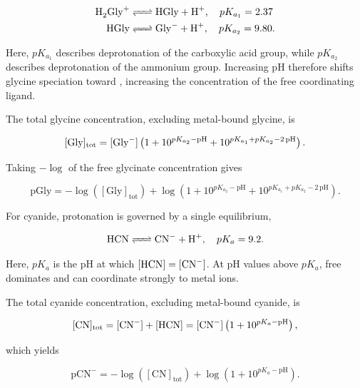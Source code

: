 \documentclass[twoside,twocolumn,9pt]{article}
\begin{document}
\begin{align} \label{eq:Gly_equilibria}
    \ce{H2Gly+ &<=> HGly + H+},  \quad pK_{a_1} = 2.37 \nonumber \\
    \ce{HGly   &<=> Gly^- + H+}, \quad pK_{a_2} = 9.80 .
\end{align}

Here, \(pK_{a_1}\) describes deprotonation of the carboxylic acid group, while \(pK_{a_2}\) describes deprotonation of the ammonium group. Increasing pH therefore shifts glycine speciation toward , increasing the concentration of the free coordinating ligand.

The total glycine concentration, excluding metal-bound glycine, is

\begin{equation} \label{eq:Gly_massbalance}
    [\mathrm{Gly}]_{\mathrm{tot}}
    = [\ce{Gly^-}]
      \left(
          1 + 10^{pK_{a_2}-\mathrm{pH}} + 10^{pK_{a_1}+pK_{a_2}-2\,\mathrm{pH}}
      \right).
\end{equation}

Taking \(-\log\) of the free glycinate concentration gives

\begin{equation} \label{eq:pGly}
    \mathrm{pGly}
    = -\log\!\left([\mathrm{Gly}]_{\mathrm{tot}}\right)
      + \log\!\left(
            1 + 10^{pK_{a_2}-\mathrm{pH}}
              + 10^{pK_{a_1}+pK_{a_2}-2\,\mathrm{pH}}
        \right).
\end{equation}

For cyanide, protonation is governed by a single equilibrium,

\begin{equation} \label{eq:HCN_equilibrium}
    \ce{HCN <=> CN^- + H+}, \quad pK_a = 9.2 .
\end{equation}

Here, \(pK_a\) is the pH at which \([\ce{HCN}] = [\ce{CN^-}]\). At pH values above \(pK_a\), free  dominates and can coordinate strongly to metal ions.

The total cyanide concentration, excluding metal-bound cyanide, is

\begin{equation} \label{eq:CN_massbalance}
    [\mathrm{CN}]_{\mathrm{tot}}
    = [\ce{CN^-}] + [\ce{HCN}]
    = [\ce{CN^-}]\left(1 + 10^{pK_a - \mathrm{pH}}\right),
\end{equation}

which yields

\begin{equation} \label{eq:pCN}
    \mathrm{pCN}^-
    = -\log\!\left([\mathrm{CN}]_{\mathrm{tot}}\right)
      + \log\!\left(1 + 10^{pK_a - \mathrm{pH}}\right).
\end{equation}
\end{document}
